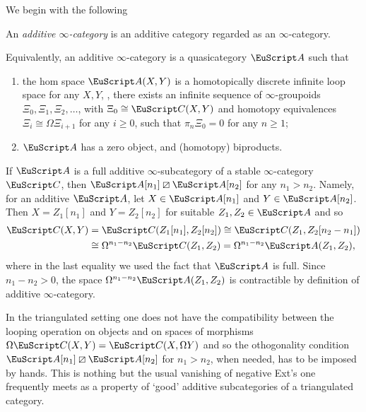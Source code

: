 We begin with the following
\begin{definition}\label{df:additive}
An \emph{additive $\infty$-category}  is an additive
category regarded as an $\infty$-category.
\end{definition}
\begin{remark}
Equivalently, an additive $\infty$-category is a quasicategory $\cate{A}$
such that
\begin{enumerate}[label=$\roman*$)]
\item the hom space $\cate{A}(X,Y)$ is a homotopically discrete infinite loop space for any $X, Y$, \ie, there exists an infinite sequence of $\infty$-groupoids $\Xi_0, \Xi_1,\Xi_2,\dots$, with $\Xi_0\cong \C(X,Y)$ and homotopy equivalences $\Xi_i\cong \Omega \Xi_{i+1}$ for any $i\geq 0$, such that $\pi_n \Xi_0=0$ for any $n\geq 1$;
\item $\cate{A}$ has a zero object, and (homotopy) biproducts.
\end{enumerate}
\end{remark}
\begin{remark}\label{orthogonality-of-a}
If $\cA$ is a full additive $\infty$-subcategory of a stable $\infty$-category $\C$, then $\cA[n_1]\orth\cA[n_2]$ for any $n_1>n_2$. Namely, for an additive $\cA$, let $X\in \cA[n_1]$ and $Y\in\cA[n_2]$. Then $X=Z_1[n_1]$ and $Y=Z_2[n_2]$ for suitable $Z_1,Z_2\in \cA$ and so 
\begin{align*}
\C(X,Y)&=\C(Z_1[n_1],Z_2[n_2])\cong  \C(Z_1,Z_2[n_2-n_1])\\
&\cong \Omega^{n_1-n_2}\C(Z_1,Z_2)=\Omega^{n_1-n_2}\cA(Z_1,Z_2),
\end{align*}
where in the last equality we used the fact that $\cA$ is full. Since $n_1-n_2>0$, the space $\Omega^{n_1-n_2}\cA(Z_1,Z_2)$ is contractible by definition of additive $\infty$-category.
\end{remark}
\begin{remark}
In the triangulated setting one does not have the compatibility between the looping operation on objects and on spaces of morphisms $\Omega\C(X,Y)=\C(X,\Omega Y)$ and so the othogonality condition $\cA[n_1]\orth\cA[n_2]$ for $n_1>n_2$, when needed, has to be imposed by hands. This is nothing but the usual vanishing of negative Ext's one frequently meets as a property of `good' additive subcategories of a triangulated category.  
\end{remark}

